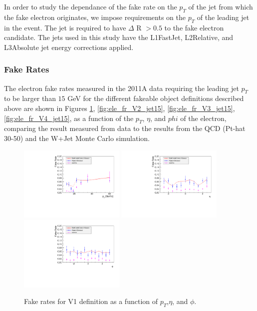 In order to study the dependance of the fake rate on the $p_{T}$ of the jet from which
the fake electron originates, we impose requirements on the $p_{T}$ of the leading jet 
in the event. The jet is required to have $\Delta$ R $ > 0.5$ 
to the fake electron candidate. The jets used in this study have the L1FastJet, L2Relative, and
L3Absolute jet energy corrections applied. 

\subsubsection{Fake Rates}
The electron fake rates measured in the 2011A data requiring the leading jet $p_{T}$ to be 
larger than $15$ GeV for the different fakeable object 
definitions described above are shown in Figures \ref{fig:ele_fr_V1_jet15},
\ref{fig:ele_fr_V2_jet15}, \ref{fig:ele_fr_V3_jet15}, \ref{fig:ele_fr_V4_jet15}, as a function of the 
$p_{T}$, $\eta$, and $phi$ of the electron, comparing the result measured from data to the
results from the QCD (Pt-hat 30-50) and the W+Jet Monte Carlo simulation.

\begin{figure}[!htbp]
\begin{center}
\includegraphics[width=0.45\textwidth]{figures/ElectronFakeRate_DenominatorV1_ptThreshold15_Pt.pdf}
\includegraphics[width=0.45\textwidth]{figures/ElectronFakeRate_DenominatorV1_ptThreshold15_Eta.pdf}
\includegraphics[width=0.45\textwidth]{figures/ElectronFakeRate_DenominatorV1_ptThreshold15_Phi.pdf}
\caption{Fake rates for V1 definition as a function of $p_T$,$\eta$, and $\phi$.}
\label{fig:ele_fr_V1_jet15}
\end{center}
\end{figure}


